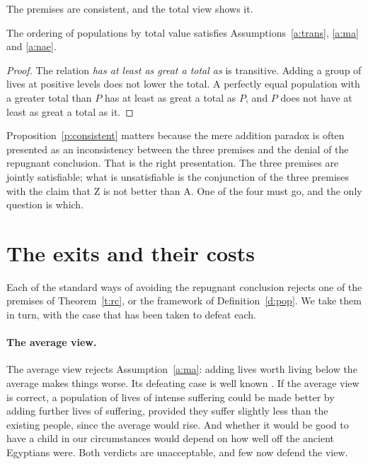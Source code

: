 \documentclass{situationist-preprint}
\begin{document}
The premises are consistent, and the total view shows it.

\begin{proposition}\label{p:consistent}
The ordering of populations by total value satisfies Assumptions~\ref{a:trans}, \ref{a:ma} and \ref{a:nae}.
\end{proposition}

\begin{proof}
The relation \emph{has at least as great a total as} is transitive. Adding a group of lives at positive levels does not lower the total. A perfectly equal population with a greater total than $P$ has at least as great a total as $P$, and $P$ does not have at least as great a total as it.
\end{proof}

Proposition~\ref{p:consistent} matters because the mere addition paradox is often presented as an inconsistency between the three premises and the denial of the repugnant conclusion. That is the right presentation. The three premises are jointly satisfiable; what is unsatisfiable is the conjunction of the three premises with the claim that Z is not better than A. One of the four must go, and the only question is which.

\section{The exits and their costs}\label{s:exits}

Each of the standard ways of avoiding the repugnant conclusion rejects one of the premises of Theorem~\ref{t:rc}, or the framework of Definition~\ref{d:pop}. We take them in turn, with the case that has been taken to defeat each.

\paragraph{The average view.} The average view rejects Assumption~\ref{a:ma}: adding lives worth living below the average makes things worse. Its defeating case is well known \citep[ch.~19]{Parfit1984}. If the average view is correct, a population of lives of intense suffering could be made better by adding further lives of suffering, provided they suffer slightly less than the existing people, since the average would rise. And whether it would be good to have a child in our circumstances would depend on how well off the ancient Egyptians were. Both verdicts are unacceptable, and few now defend the view.
\end{document}

